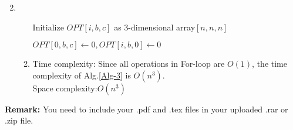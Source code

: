 \documentclass[12pt,a4paper]{article}
\makeatletter
\newtheorem*{solution}{Solution}
\theoremstyle{definition}
\renewenvironment{solution}[1][Solution] {\par\pushQED{\qed}\normalfont\topsep6\p@\@plus6\p@\relax\trivlist\item[\hskip\labelsep\bfseries#1\@addpunct{.}]\ignorespaces}{\popQED\endtrivlist\@endpefalse} \makeatother
\makeatother
\begin{document}
\begin{enumerate}
\begin{solution}
\begin{enumerate}
\begin{minipage}[t]{0.89\textwidth}
\begin{algorithm}[H]
					Initialize $ OPT[i,b,c] $ as 3-dimensional array$ [n,n,n] $\;
					
					$OPT[0,b,c]\leftarrow0,OPT[i,b,0]\leftarrow0 $\;
					
					
					\;
					
				\end{algorithm}
			\end{minipage}
			\item Time complexity: Since all operations in For-loop are $ O(1) $, the time complexity of Alg.\ref{Alg-3} is $ O(n^3) $.\\
			Space complexity:$  O(n^3) $
		\end{enumerate}
	\end{solution}

\end{enumerate}

\vspace{20pt}

\textbf{Remark:} You need to include your .pdf and .tex files in your uploaded .rar or .zip file.

\end{document}
